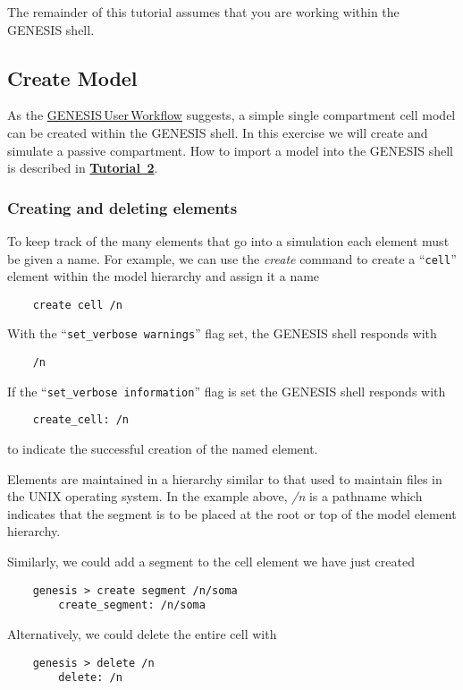 \documentclass[12pt]{article}
\begin{document}
The remainder of this tutorial assumes that you are working within the GENESIS shell.

\subsection*{Create Model}

As the \href{../workflow-user/workflow-user.tex}{GENESIS\,User\,Workflow} suggests, a simple single compartment cell model can be created within the GENESIS shell. In this exercise we will create and simulate a passive compartment. How to import a model into the GENESIS shell is described in \href{../tutorial2/tutorial2.tex}{\bf Tutorial \,2}.

\subsubsection*{Creating and deleting elements}

To keep track of the many elements that go into a simulation each element must be given a name. For example, we can use the {\it create} command to create a ``{\tt cell}'' element within the model hierarchy and assign it a name  
\begin{verbatim}
    create cell /n
\end{verbatim}
With the  ``{\tt set\_verbose warnings}'' flag set, the GENESIS shell responds with
\begin{verbatim}
    /n
\end{verbatim}
If the ``{\tt set\_verbose information}'' flag is set the GENESIS shell responds with
\begin{verbatim}
    create_cell: /n
\end{verbatim}
to indicate the successful creation of the named element.

Elements are maintained in a hierarchy similar to that used to maintain files in the UNIX operating system. In the example above, {\it /n} is a pathname which indicates that the segment is to be placed at the root or top of the model element hierarchy.

Similarly, we could add a segment to the cell element we have just created
\begin{verbatim}
    genesis > create segment /n/soma
        create_segment: /n/soma
\end{verbatim}
Alternatively, we could delete the entire cell with 
\begin{verbatim}
    genesis > delete /n
        delete: /n
\end{verbatim}
\end{document}
